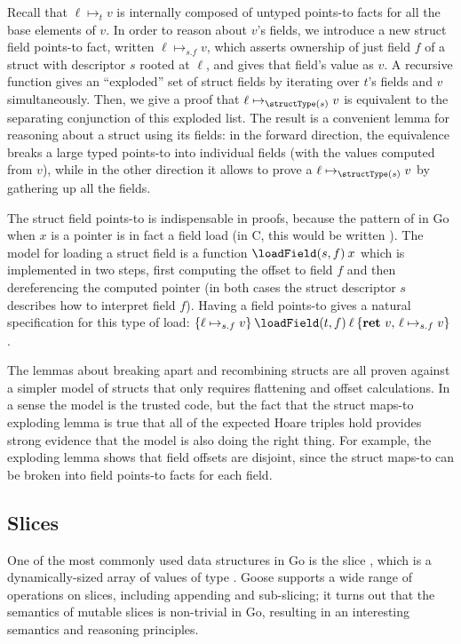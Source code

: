 Recall that $\ell \mapsto_t v$ is internally composed of untyped
points-to facts for all the base elements of $v$. In order to reason
about $v$'s fields, we introduce a new struct field points-to fact,
written $\ell \mapsto_{s.f} v$, which asserts ownership of just field
$f$ of a struct with descriptor $s$ rooted at $\ell$, and gives that field's
value as $v$. A recursive function gives an ``exploded'' set of struct
fields by iterating over $t$'s fields and $v$ simultaneously. Then,
we give a proof that $\ell \mapsto_{\structType(s)} v$ is equivalent to the separating
conjunction of this exploded list. The result is a convenient lemma for
reasoning about a struct using its fields: in the forward direction, the
equivalence breaks a large typed points-to into individual fields (with
the values computed from $v$), while in the other direction it allows
to prove a $\ell \mapsto_{\structType(s)} v$ by gathering up all the fields.

The struct field points-to is indispensable in proofs, because the
pattern of  in Go when $x$ is a pointer is in fact a field
load (in C, this would be written ). The model
for loading a struct field is a function $\loadField(s, f) \app x$
which is implemented in two steps, first computing the offset to field
$f$ and then dereferencing the computed pointer (in both cases the struct descriptor $s$
describes how to interpret field $f$). Having a field points-to gives
a natural specification for this type of load:
$\hoare{\ell \mapsto_{s.f} v}{\loadField(t, f) \app \ell}{\Ret{v} \ell \mapsto_{s.f} v}$.

The lemmas about breaking apart and recombining structs are all proven
against a simpler model of structs that only requires flattening and
offset calculations. In a sense the model is the trusted code, but the
fact that the struct maps-to exploding lemma is true that all of the
expected Hoare triples hold provides strong evidence that the model is
also doing the right thing. For example, the exploding lemma shows that
field offsets are disjoint, since the struct maps-to can be broken into
field points-to facts for each field.

\subsection{Slices}

One of the most commonly used data structures in Go is the slice
, which is a dynamically-sized array of values of type
. Goose supports a wide range of operations on slices,
including appending and sub-slicing; it turns out that the semantics of
mutable slices is non-trivial in Go, resulting in an interesting
semantics and reasoning principles.

